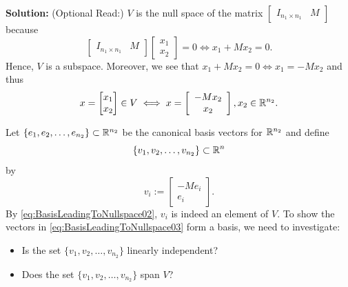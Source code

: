 \textbf{Solution:} (Optional Read:) $V$ is the null space of the matrix $\left[\begin{array}{cc}
    I_{n_1 \times n_1} & M
\end{array}\right]$ because
$$\left[\begin{array}{cc}
    I_{n_1 \times n_1} & M
\end{array}\right]\begin{bmatrix} x_1 \\x_2 \end{bmatrix} =0 \iff x_1 + M x_2 = 0. $$
Hence, $V$ is a subspace. Moreover, we see that $ x_1 + M x_2 = 0 \iff x_1 = - M x_2$ and thus 
\begin{equation}
\label{eq:BasisLeadingToNullspace02}
x=\begin{bmatrix} x_1 \\x_2 \end{bmatrix} \in V \iff x = \left[\begin{array}{c}
    -Mx_2 \\ x_2
\end{array}\right], x_2 \in \mathbb R^{n_2}.
\end{equation}

Let $\{ e_1, e_2, \ldots, e_{n_2} \} \subset \mathbb R^{n_2}$ be the canonical basis vectors for $\mathbb R^{n_2}$ and define
$$
\{ v_1, v_2, \ldots, v_{n_2}\} \subset \mathbb R^n $$
by  
\begin{equation}
\label{eq:BasisLeadingToNullspace03}
v_i:=\left[\begin{array}{c}
    -Me_i \\ e_i
\end{array}\right].
\end{equation}
By \eqref{eq:BasisLeadingToNullspace02}, $v_i$ is indeed an element of $V$. To show the vectors in \eqref{eq:BasisLeadingToNullspace03} form a basis, we need to investigate:
\begin{itemize}
    \item Is the set $\{ v_1, v_2, \ldots, v_{n_2}\}$ linearly independent?
    \item Does the set $\{ v_1, v_2, \ldots, v_{n_2}\}$ span $V$?
\end{itemize}

